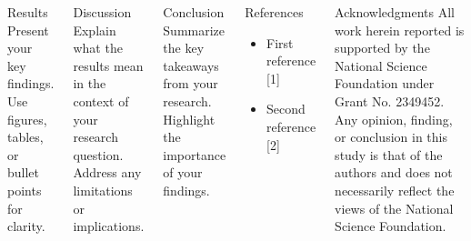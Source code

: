 \documentclass[20pt]{beamer}
\begin{document}
\begin{frame}[t]
\begin{columns}[t]
  \begin{block}{Results}
    Present your key findings. 
    Use figures, tables, or bullet points for clarity.
  \end{block}

  \begin{block}{Discussion}
    Explain what the results mean in the context of your research question. 
    Address any limitations or implications.
  \end{block}


  \begin{block}{Conclusion}
    Summarize the key takeaways from your research. 
    Highlight the importance of your findings.
  \end{block}

  \begin{block}{References}
    \begin{itemize}
      \item First reference [1]
      \item Second reference [2]
    \end{itemize}
  \end{block}

  \begin{block}{Acknowledgments}
    All work herein reported is supported by the National Science Foundation under Grant No. 2349452.
    Any opinion, finding, or conclusion in this study is that of the authors and does not necessarily reflect the views of the National Science Foundation.
  \end{block}

\end{columns}

\end{frame}
\end{document}
